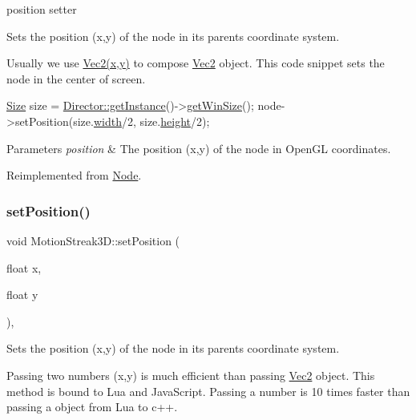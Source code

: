 position setter 

Sets the position (x,y) of the node in its parent\textquotesingle{}s coordinate system.

Usually we use {\ttfamily \hyperlink{classVec2}{Vec2(x,y)}} to compose \hyperlink{classVec2}{Vec2} object. This code snippet sets the node in the center of screen. 
\begin{DoxyCode}
\hyperlink{classSize}{Size} size = \hyperlink{classDirector_a8d2a4ca9e20cd400ddadd516efa111e0}{Director::getInstance}()->\hyperlink{classDirector_af07668df4a8916e6eb0f79a93f6588fe}{getWinSize}();
node->setPosition(size.\hyperlink{classSize_af0be19024ddd79e7843492b3760c21f0}{width}/2, size.\hyperlink{classSize_a880fa21eaad5a5a0fe439d440776fd05}{height}/2);
\end{DoxyCode}



\begin{DoxyParams}{Parameters}
{\em position} & The position (x,y) of the node in Open\+GL coordinates. \\
\hline
\end{DoxyParams}


Reimplemented from \hyperlink{classNode_a8ffbf25763ef5f15eeae7227779505bc}{Node}.

\mbox{\label{classMotionStreak3D_ada67cecb8a81f0f48615d24eb9fc2373}} 
\subsubsection{\texorpdfstring{set\+Position()}{setPosition()}\hspace{0.1cm}{\footnotesize\ttfamily [2/4]}}
{\footnotesize\ttfamily void Motion\+Streak3\+D\+::set\+Position (\begin{DoxyParamCaption}\item[{float}]{x,  }\item[{float}]{y }\end{DoxyParamCaption})\hspace{0.3cm}{\ttfamily [override]}, {\ttfamily [virtual]}}

Sets the position (x,y) of the node in its parent\textquotesingle{}s coordinate system.

Passing two numbers (x,y) is much efficient than passing \hyperlink{classVec2}{Vec2} object. This method is bound to Lua and Java\+Script. Passing a number is 10 times faster than passing a object from Lua to c++.


